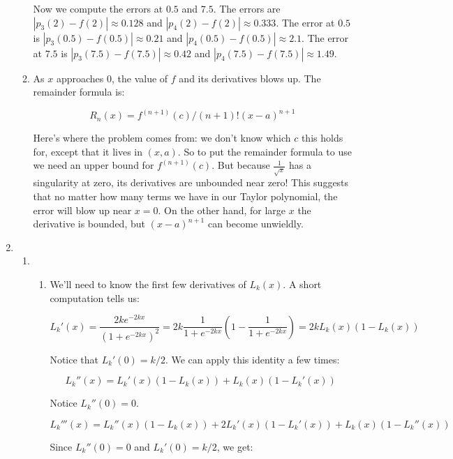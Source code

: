 \begin{enumerate}
\begin{enumerate}
                Now we compute the errors at $0.5$ and $7.5$. The errors are $|p_3(2)-f(2)| \approx 0.128$ and $|p_4(2)-f(2)| \approx 0.333$. The error at $0.5$ is $|p_3(0.5)-f(0.5)| \approx 0.21$ and $|p_4(0.5)-f(0.5)| \approx 2.1$. The error at $7.5$ is $|p_3(7.5)-f(7.5)| \approx 0.42$ and $|p_4(7.5)-f(7.5)| \approx 1.49$. 

                \item As $x$ approaches $0$, the value of $f$ and its derivatives blows up. The remainder formula is:

                \[R_n(x) = f^{(n+1)}(c)/(n+1)!(x-a)^{n+1}\]

                Here's where the problem comes from: we don't know which $c$ this holds for, except that it lives in $(x,a)$. So to put the remainder formula to use we need an upper bound for $f^{(n+1)}(c)$. But because $\frac{1}{\sqrt{x}}$ has a singularity at zero, its derivatives are unbounded near zero! This suggests that no matter how many terms we have in our Taylor polynomial, the error will blow up near $x=0$. On the other hand, for large $x$ the derivative is bounded, but $(x-a)^{n+1}$ can become unwieldly. 

                
                
                

                
			\end{enumerate}
			\item \begin{enumerate}
			    \item 
                \begin{enumerate} \item 
                We'll need to know the first few derivatives of $L_k(x)$. A short computation tells us:

                \[L_k'(x) = \frac{2ke^{-2kx}}{(1+e^{-2kx})^2} = 2k\frac{1}{1+e^{-2kx}}(1-\frac{1}{1+e^{-2kx}})=2kL_k(x)(1-L_k(x))\]

                Notice that $L_k'(0) = k/2$. We can apply this identity a few times:

                \[L_k''(x) = L_k'(x)(1-L_k(x)) + L_k(x)(1-L_k'(x))\]

                Notice $L_k''(0) = 0$. 

                \[L_k'''(x) = L_k''(x)(1-L_k(x)) + 2L_k'(x)(1-L_k'(x)) + L_k(x)(1-L_k''(x))\]

                Since $L_k''(0) = 0$ and $L_k'(0) = k/2$, we get:


\end{enumerate}
\end{enumerate}
\end{enumerate}
